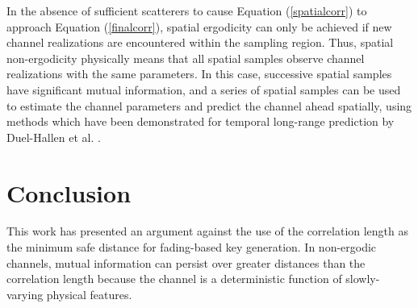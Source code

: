 \documentclass[conference]{ieeetran}
\begin{document}
In the absence of sufficient scatterers to cause Equation (\ref{spatialcorr}) to approach Equation (\ref{finalcorr}), spatial ergodicity can only be achieved if new channel realizations are encountered within the sampling region.  Thus, spatial non-ergodicity physically means that all spatial samples observe channel realizations with the same parameters.  In this case, successive spatial samples have significant mutual information, and a series of spatial samples can be used to estimate the channel parameters and predict the channel ahead spatially, using methods which have been demonstrated for temporal long-range prediction by Duel-Hallen et al. \cite{duel-hallen2000}.


%
%

\section{Conclusion}
This work has presented an argument against the use of the correlation length as the minimum safe distance for fading-based key generation.  In non-ergodic channels, mutual information can persist over greater distances than the correlation length because the channel is a deterministic function of slowly-varying physical features.

{}
\end{document}
